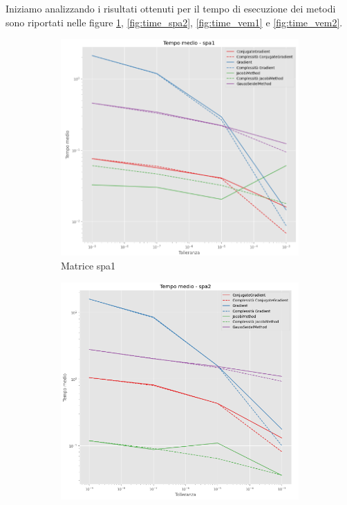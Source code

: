 Iniziamo analizzando i risultati ottenuti per il tempo di esecuzione dei metodi
sono riportati nelle figure \ref{fig:time_spa1}, \ref{fig:time_spa2}, \ref{fig:time_vem1}
e \ref{fig:time_vem2}.
\begin{figure}[!ht]
    \centering
    \begin{subfigure}{0.45\textwidth}
        \centering
        \includegraphics[width=\textwidth]{./../report/Progetto_1_bis/img/time_spa1.png}
        \caption{Matrice spa1}
        \label{fig:time_spa1}
    \end{subfigure}
    \hfill
    \begin{subfigure}{0.45\textwidth}
        \centering
        \includegraphics[width=\textwidth]{./../report/Progetto_1_bis/img/time_spa2.png}

\end{subfigure}
\end{figure}

